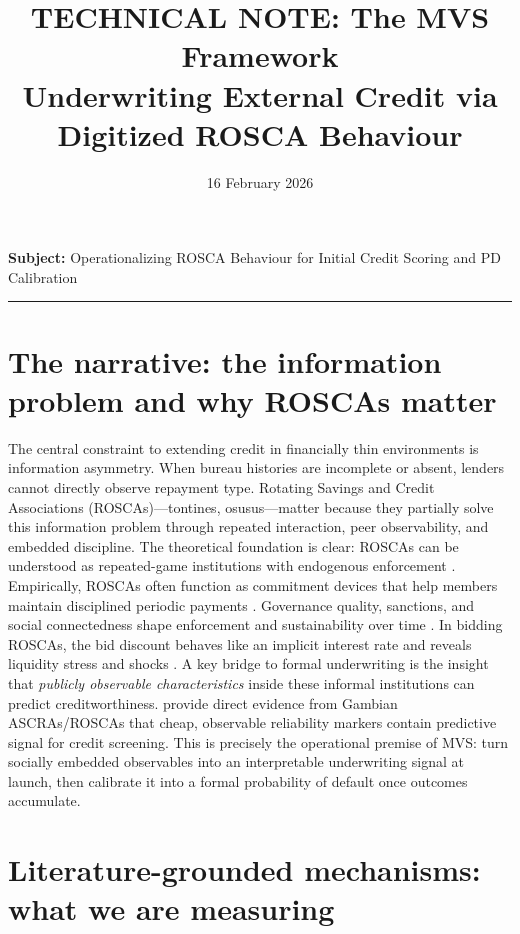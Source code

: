 \documentclass[11t]{article}
\title{\textbf{TECHNICAL NOTE: The MVS Framework}\\
Underwriting External Credit via Digitized ROSCA Behaviour}
\author{}
\date{16 February 2026}
\begin{document}
\maketitle

\textbf{Subject:} Operationalizing ROSCA Behaviour for Initial Credit Scoring and PD Calibration

\vspace{0.5em}
\hrule
\vspace{0.8em}

\section{The narrative: the information problem and why ROSCAs matter}

The central constraint to extending credit in financially thin environments is information asymmetry. When bureau histories are incomplete or absent, lenders cannot directly observe repayment type. 
Rotating Savings and Credit Associations (ROSCAs)—tontines, osusus—matter because they partially solve this information problem through repeated interaction, peer observability, and embedded discipline.
The theoretical foundation is clear: ROSCAs can be understood as repeated-game institutions with endogenous enforcement \citet{BesleyCoateLoury1993}. Empirically, ROSCAs often function as commitment devices that help members maintain disciplined periodic payments \citet{Gugerty2007}. 
Governance quality, sanctions, and social connectedness shape enforcement and sustainability over time \citet{McNabbLeMayBoucherBonan2019}. In bidding ROSCAs, the bid discount behaves like an implicit interest rate and reveals liquidity stress and shocks \citet{Klonner2003,CalomirisRajaraman1998}.
A key bridge to formal underwriting is the insight that \emph{publicly observable characteristics} inside these informal institutions can predict creditworthiness. 
\citet{SchreinerNagarajan2000} provide direct evidence from Gambian ASCRAs/ROSCAs that cheap, observable reliability markers contain predictive signal for credit screening. 
This is precisely the operational premise of MVS: turn socially embedded observables into an interpretable underwriting signal at launch, then calibrate it into a formal probability of default once outcomes accumulate.

\section{Literature-grounded mechanisms: what we are measuring}
\end{document}
